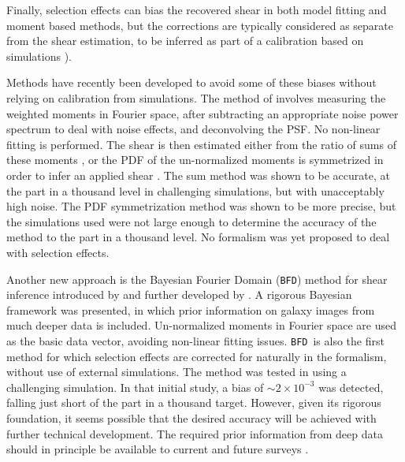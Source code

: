 \documentclass[iop]{emulateapj}
\newcommand{\bfd}{\texttt{BFD}}
\begin{document}
Finally, selection effects can bias the recovered shear in both model fitting
and moment based methods, but the corrections are typically considered as
separate from the shear estimation, to be inferred as part of a calibration
based on simulations \citep{Jarvis2016,KidsShear2016}).

Methods have recently been developed to avoid some of these biases without
relying on calibration from simulations.  The method of \cite{Zhang2017}
involves measuring the weighted moments in Fourier space, after subtracting an
appropriate noise power spectrum to deal with noise effects, and deconvolving
the PSF.  No non-linear fitting is performed.  The shear is then estimated
either from the ratio of sums of these moments \citep{Zhang2015}, or the PDF of
the un-normalized moments is symmetrized in order to infer an applied shear
\citep{Zhang2017}.  The sum method was shown to be accurate, at the part in a
thousand level in challenging simulations, but with unacceptably high noise.
The PDF symmetrization method was shown to be more precise, but the simulations
used were not large enough to determine the accuracy of the method to the part
in a thousand level.  No formalism was yet proposed to deal with selection
effects. 

Another new approach is the Bayesian Fourier Domain (\bfd) method for shear
inference introduced by \cite{ba14} and further developed by \cite{bfd2016}.  A
rigorous Bayesian framework was presented, in which prior information on galaxy
images from much deeper data is included.  Un-normalized moments in
Fourier space are used as the basic data vector, avoiding non-linear fitting
issues.  \bfd\ is also the first method for which selection effects are
corrected for naturally in the formalism, without use of external
simulations.  The method was tested in \cite{bfd2016} using a challenging
simulation.  In that initial study, a bias of $\sim 2 \times 10^{-3}$ was
detected, falling just short of the part in a thousand target.  However, given
its rigorous foundation, it seems possible that the desired accuracy will be
achieved with further technical development.  The required prior information
from deep data should in principle be available to current and future surveys
\citep{DESWhitePaper,TakadaHSC2010,IvezicLSST08,Euclid2011,SpergelWFIRST2015}.


\end{document}
